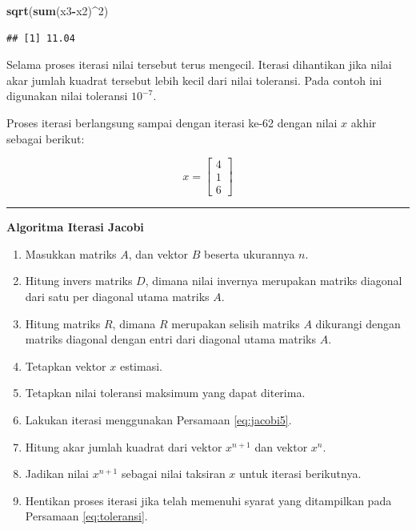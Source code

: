 \documentclass[]{book}
\newenvironment{Shaded}{\begin{snugshade}}{\end{snugshade}}
\newcommand{\DecValTok}[1]{\textcolor[rgb]{0.00,0.00,0.81}{#1}}
\newcommand{\KeywordTok}[1]{\textcolor[rgb]{0.13,0.29,0.53}{\textbf{#1}}}
\newcommand{\NormalTok}[1]{#1}
\newcommand{\OperatorTok}[1]{\textcolor[rgb]{0.81,0.36,0.00}{\textbf{#1}}}
\providecommand{\tightlist}{%
  \setlength{\itemsep}{0pt}\setlength{\parskip}{0pt}}
\theoremstyle{definition}
\theoremstyle{definition}
\theoremstyle{definition}
\theoremstyle{remark}
\begin{document}
\begin{Shaded}
\begin{Highlighting}[]
\KeywordTok{sqrt}\NormalTok{(}\KeywordTok{sum}\NormalTok{(x3}\OperatorTok{-}\NormalTok{x2)}\OperatorTok{^}\DecValTok{2}\NormalTok{)}
\end{Highlighting}
\end{Shaded}

\begin{verbatim}
## [1] 11.04
\end{verbatim}

Selama proses iterasi nilai tersebut terus mengecil. Iterasi dihantikan jika nilai akar jumlah kuadrat tersebut lebih kecil dari nilai toleransi. Pada contoh ini digunakan nilai toleransi \(10^{-7}\).

Proses iterasi berlangsung sampai dengan iterasi ke-62 dengan nilai \(x\) akhir sebagai berikut:

\[
x = \begin{bmatrix}
     4     \\[0.3em]
     1     \\[0.3em]
     6
\end{bmatrix}
\]

\begin{center}\rule{0.5\linewidth}{\linethickness}\end{center}

\textbf{Algoritma Iterasi Jacobi}

\begin{enumerate}
\def\labelenumi{\arabic{enumi}.}
\tightlist
\item
  Masukkan matriks \(A\), dan vektor \(B\) beserta ukurannya \(n\).
\item
  Hitung invers matriks \(D\), dimana nilai invernya merupakan matriks diagonal dari satu per diagonal utama matriks \(A\).
\item
  Hitung matriks \(R\), dimana \(R\) merupakan selisih matriks \(A\) dikurangi dengan matriks diagonal dengan entri dari diagonal utama matriks \(A\).
\item
  Tetapkan vektor \(x\) estimasi.
\item
  Tetapkan nilai toleransi maksimum yang dapat diterima.
\item
  Lakukan iterasi menggunakan Persamaan \eqref{eq:jacobi5}.
\item
  Hitung akar jumlah kuadrat dari vektor \(x^{n+1}\) dan vektor \(x^n\).
\item
  Jadikan nilai \(x^{n+1}\) sebagai nilai taksiran \(x\) untuk iterasi berikutnya.
\item
  Hentikan proses iterasi jika telah memenuhi syarat yang ditampilkan pada Persamaan \eqref{eq:toleransi}.
\end{enumerate}
\end{document}
